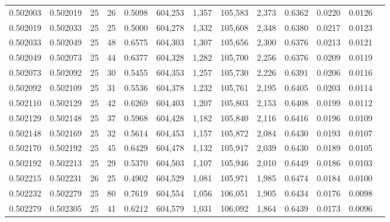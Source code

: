 \begin{tabular}{rrrrrrrrrrrrr}
0.502003 & 0.502019 &    25 &  26 &                                     0.5098 & 604,253 &   1,357 & 105,583 &   2,373 & 0.6362 & 0.0220 & 0.0126 \\
0.502019 & 0.502033 &    25 &  25 &                                     0.5000 & 604,278 &   1,332 & 105,608 &   2,348 & 0.6380 & 0.0217 & 0.0123 \\
0.502033 & 0.502049 &    25 &  48 &                                     0.6575 & 604,303 &   1,307 & 105,656 &   2,300 & 0.6376 & 0.0213 & 0.0121 \\
0.502049 & 0.502073 &    25 &  44 &                                     0.6377 & 604,328 &   1,282 & 105,700 &   2,256 & 0.6376 & 0.0209 & 0.0119 \\
0.502073 & 0.502092 &    25 &  30 &                                     0.5455 & 604,353 &   1,257 & 105,730 &   2,226 & 0.6391 & 0.0206 & 0.0116 \\
0.502092 & 0.502109 &    25 &  31 &                                     0.5536 & 604,378 &   1,232 & 105,761 &   2,195 & 0.6405 & 0.0203 & 0.0114 \\
0.502110 & 0.502129 &    25 &  42 &                                     0.6269 & 604,403 &   1,207 & 105,803 &   2,153 & 0.6408 & 0.0199 & 0.0112 \\
0.502129 & 0.502148 &    25 &  37 &                                     0.5968 & 604,428 &   1,182 & 105,840 &   2,116 & 0.6416 & 0.0196 & 0.0109 \\
0.502148 & 0.502169 &    25 &  32 &                                     0.5614 & 604,453 &   1,157 & 105,872 &   2,084 & 0.6430 & 0.0193 & 0.0107 \\
0.502170 & 0.502192 &    25 &  45 &                                     0.6429 & 604,478 &   1,132 & 105,917 &   2,039 & 0.6430 & 0.0189 & 0.0105 \\
0.502192 & 0.502213 &    25 &  29 &                                     0.5370 & 604,503 &   1,107 & 105,946 &   2,010 & 0.6449 & 0.0186 & 0.0103 \\
0.502215 & 0.502231 &    26 &  25 &                                     0.4902 & 604,529 &   1,081 & 105,971 &   1,985 & 0.6474 & 0.0184 & 0.0100 \\
0.502232 & 0.502279 &    25 &  80 &                                     0.7619 & 604,554 &   1,056 & 106,051 &   1,905 & 0.6434 & 0.0176 & 0.0098 \\
0.502279 & 0.502305 &    25 &  41 &                                     0.6212 & 604,579 &   1,031 & 106,092 &   1,864 & 0.6439 & 0.0173 & 0.0096 \\

\end{tabular}
